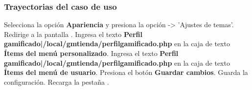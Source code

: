\subsubsection{Trayectorias del caso de uso}

\begin{UCtrayectoria}%
%
    \Actor Selecciona la opción \textbf{Apariencia}  y presiona la opción -> 'Ajustes de temas'.
    \Sistema Redirige a la pantalla .
    \Actor Ingresa el texto \textbf{Perfil gamificado|/local/gmtienda/perfilgamificado.php} en la caja de texto \textbf{Ítems del menú personalizado}.
    \Actor Ingresa el texto \textbf{Perfil gamificado|/local/gmtienda/perfilgamificado.php} en la caja de texto \textbf{Ítems del menú de usuario}.
    \Actor Presiona el botón \textbf{Guardar cambios}.
    \Sistema Guarda la configuración.
    \Sistema Recarga la pestaña  .
    
\end{UCtrayectoria}
